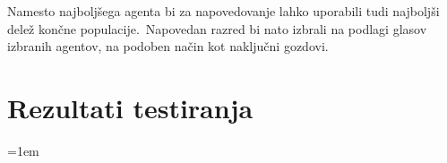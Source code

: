 \documentclass[a4paper,12pt,openright]{book}
\begin{document}
    Namesto najboljšega agenta bi za napovedovanje lahko uporabili tudi najboljši delež
    končne populacije.\ Napovedan razred bi nato izbrali na podlagi glasov izbranih agentov, na podoben način kot naključni gozdovi.

    \appendix
    \chapter{Rezultati testiranja}\label{ch:rezultati-testiranja}
    





    \emergencystretch=1em
    \printbibliography[heading=bibintoc,title={Literatura}]
\end{document}
